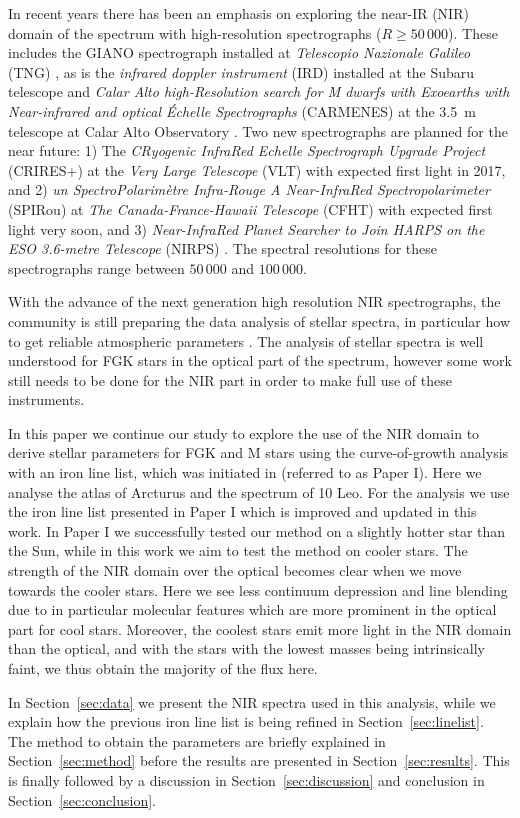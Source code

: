 \documentclass{aa}
\begin{document}
{In recent years there has been an emphasis on exploring the near-IR (NIR) domain of the spectrum
with high-resolution spectrographs ($R\ge50\,000$). These includes the GIANO spectrograph installed
at \emph{Telescopio Nazionale Galileo} (TNG) \citep{GIANO}, as is the \emph{infrared doppler
instrument} (IRD) installed at the Subaru telescope \citep{IRD} and \emph{Calar Alto high-Resolution
search for M dwarfs with Exoearths with Near-infrared and optical Échelle Spectrographs} (CARMENES)
at the \SI{3.5}{m} telescope at Calar Alto Observatory \citep{CARMENES}. Two new spectrographs are
planned for the near future: 1) The \emph{CRyogenic InfraRed Echelle Spectrograph Upgrade Project}
(CRIRES+) at the \emph{Very Large Telescope} (VLT) \citep{CRIRESp} with expected first light in
2017, and 2) \emph{un SpectroPolarimètre Infra-Rouge A Near-InfraRed Spectropolarimeter} (SPIRou) at
\emph{The Canada-France-Hawaii Telescope} (CFHT) \citep{SPIROU1,SPIROU2} with expected first light
very soon, and 3) \emph{Near-InfraRed Planet Searcher to Join HARPS on the ESO 3.6-metre Telescope}
(NIRPS) \citep{Bouchy2017}. The spectral resolutions for these spectrographs range between $50\,000$
and $100\,000$.

With the advance of the next generation high resolution NIR spectrographs, the community is still
preparing the data analysis of stellar spectra, in particular how to get reliable atmospheric
parameters \citep[see e.g.][]{Onehag2012,Lindgren2016,Andreasen2016,Passegger2016}. The analysis of
stellar spectra is well understood for FGK stars in the optical part of the spectrum, however some
work still needs to be done for the NIR part in order to make full use of these instruments.

In this paper we continue our study to explore the use of the NIR domain to derive stellar
parameters for FGK and M stars using the curve-of-growth analysis with an iron line list, which was
initiated in \citet{Andreasen2016} (referred to as Paper I). Here we analyse the atlas of Arcturus
and the spectrum of 10 Leo. For the analysis we use the iron line list presented in Paper I which is
improved and updated in this work. In Paper I we successfully tested our method on a slightly hotter
star than the Sun, while in this work we aim to test the method on cooler stars. The strength of the
NIR domain over the optical becomes clear when we move towards the cooler stars. Here we see less
continuum depression and line blending due to in particular molecular features which are more
prominent in the optical part for cool stars. Moreover, the coolest stars emit more light in the NIR
domain than the optical, and with the stars with the lowest masses being intrinsically faint, we
thus obtain the majority of the flux here.

In Section~\ref{sec:data} we present the NIR spectra used in this analysis, while we explain how the
previous iron line list is being refined in Section~\ref{sec:linelist}. The method to obtain the
parameters are briefly explained in Section~\ref{sec:method} before the results are presented in
Section~\ref{sec:results}. This is finally followed by a discussion in Section~\ref{sec:discussion}
and conclusion in Section~\ref{sec:conclusion}.
}
\end{document}
